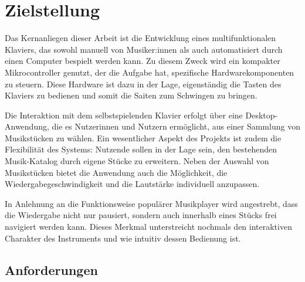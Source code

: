 
\chapter{Zielstellung} \label{Zielstellung}

\nocite{*}


Das Kernanliegen dieser Arbeit ist die Entwicklung eines multifunktionalen Klaviers,
das sowohl manuell von Musiker:innen als auch automatisiert durch einen Computer bespielt werden kann.
Zu diesem Zweck wird ein kompakter Mikrocontroller genutzt, der die Aufgabe hat, spezifische Hardwarekomponenten zu steuern.
Diese Hardware ist dazu in der Lage, eigenständig die Tasten des Klaviers zu bedienen und somit die Saiten zum Schwingen zu bringen.

Die Interaktion mit dem selbstspielenden Klavier erfolgt über eine Desktop-Anwendung, die es Nutzerinnen und Nutzern ermöglicht,
aus einer Sammlung von Musikstücken zu wählen.
Ein wesentlicher Aspekt des Projekts ist zudem die Flexibilität des Systems: Nutzende sollen in der Lage sein,
den bestehenden Musik-Katalog durch eigene Stücke zu erweitern.
Neben der Auswahl von Musikstücken bietet die Anwendung auch die Möglichkeit,
die Wiedergabegeschwindigkeit und die Lautstärke individuell anzupassen.

In Anlehnung an die Funktionsweise populärer Musikplayer wird angestrebt,
dass die Wiedergabe nicht nur pausiert, sondern auch innerhalb eines Stücks frei navigiert werden kann.
Dieses Merkmal unterstreicht nochmals den interaktiven Charakter des Instruments und wie intuitiv dessen Bedienung ist.

\newpage
\section{Anforderungen} \label{sec:zielstellung-anforderungen}

